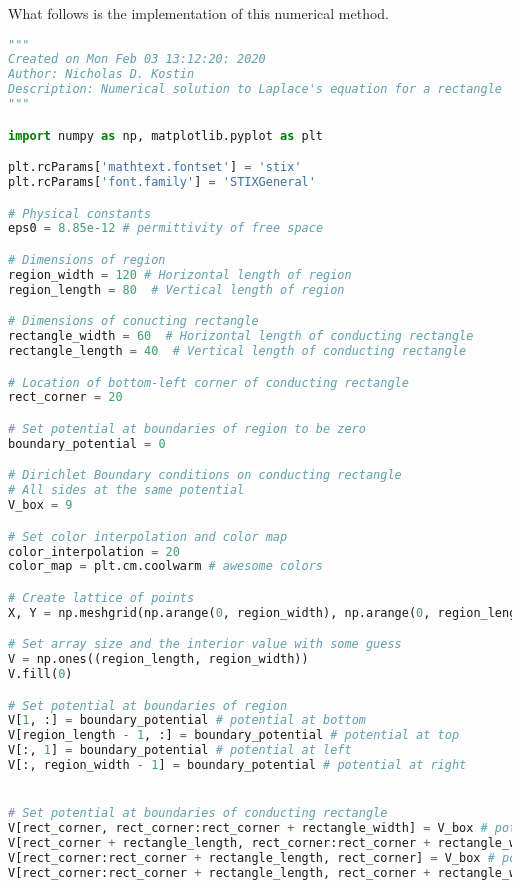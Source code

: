 \documentclass{article}
\numberwithin{equation}{section}
\begin{document}
What follows is the implementation of this numerical method.

% 

\begin{lstlisting}[language=Python]
"""
Created on Mon Feb 03 13:12:20: 2020
Author: Nicholas D. Kostin
Description: Numerical solution to Laplace's equation for a rectangle
"""

import numpy as np, matplotlib.pyplot as plt

plt.rcParams['mathtext.fontset'] = 'stix'
plt.rcParams['font.family'] = 'STIXGeneral'

# Physical constants
eps0 = 8.85e-12 # permittivity of free space

# Dimensions of region
region_width = 120 # Horizontal length of region
region_length = 80  # Vertical length of region

# Dimensions of conucting rectangle
rectangle_width = 60  # Horizontal length of conducting rectangle
rectangle_length = 40  # Vertical length of conducting rectangle

# Location of bottom-left corner of conducting rectangle
rect_corner = 20

# Set potential at boundaries of region to be zero
boundary_potential = 0

# Dirichlet Boundary conditions on conducting rectangle
# All sides at the same potential
V_box = 9

# Set color interpolation and color map
color_interpolation = 20
color_map = plt.cm.coolwarm # awesome colors

# Create lattice of points
X, Y = np.meshgrid(np.arange(0, region_width), np.arange(0, region_length))

# Set array size and the interior value with some guess
V = np.ones((region_length, region_width))
V.fill(0)

# Set potential at boundaries of region
V[1, :] = boundary_potential # potential at bottom
V[region_length - 1, :] = boundary_potential # potential at top
V[:, 1] = boundary_potential # potential at left
V[:, region_width - 1] = boundary_potential # potential at right


# Set potential at boundaries of conducting rectangle
V[rect_corner, rect_corner:rect_corner + rectangle_width] = V_box # potential at bottom
V[rect_corner + rectangle_length, rect_corner:rect_corner + rectangle_width] = V_box # potential at top
V[rect_corner:rect_corner + rectangle_length, rect_corner] = V_box # potential at left
V[rect_corner:rect_corner + rectangle_length, rect_corner + rectangle_width] = V_box # potential at right


\end{lstlisting}
\end{document}
